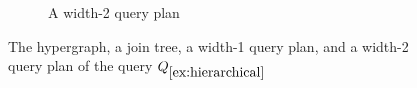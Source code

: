 \begin{figure}
\begin{subfigure}{.25\linewidth}
        \caption{A width-2 query plan}
        \label{fig:non-hierarchical-plan}
    \end{subfigure}
    \caption{The hypergraph, a join tree, a width-1 query plan, and a width-2 query plan of the query $Q_{\ref{ex:hierarchical}}$}
    \label{fig:hierarchical}
\end{figure}
